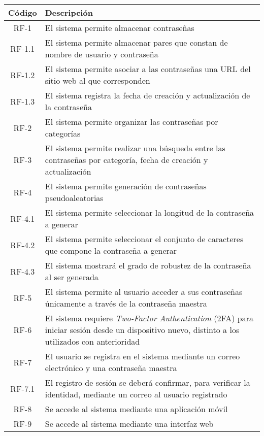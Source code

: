\documentclass{article}
\begin{document}
\begin{table}[H]
    \centering
    \begin{tabular}{| c | p{30em} |}
    \hline
        Código &  Descripción  \\ \hline
        RF-1 & El sistema permite almacenar contraseñas \\ \hline
        RF-1.1 & El sistema permite almacenar pares que constan de nombre de usuario y contraseña  \\ \hline
        RF-1.2 & El sistema permite asociar a las contraseñas una URL del sitio web al que corresponden \\ \hline
        RF-1.3 & El sistema registra la fecha de creación y actualización de la contraseña \\ \hline
        RF-2 & El  sistema permite organizar las contraseñas por categorías \\ \hline
        RF-3 & El sistema permite realizar una búsqueda entre las contraseñas por categoría, fecha de creación y actualización  \\ \hline
        RF-4 & El sistema permite generación de contraseñas pseudoaleatorias \\ \hline
        RF-4.1 & El sistema permite seleccionar la longitud de la contraseña a generar\\ \hline
        RF-4.2 & El sistema permite seleccionar el conjunto de caracteres que compone la contraseña a generar\\ \hline
        RF-4.3 & El sistema mostrará el grado de robustez de la contraseña al ser generada \\ \hline 
        RF-5 & El sistema permite al usuario acceder a sus contraseñas únicamente a través de la contraseña maestra \\ \hline
        RF-6 & El sistema requiere \textit{Two-Factor Authentication} (2FA) para iniciar sesión desde un dispositivo nuevo, distinto a los utilizados con anterioridad \\ \hline
        RF-7 & El usuario se registra en el sistema mediante un correo electrónico y una contraseña maestra\\ \hline
        RF-7.1 & El registro de sesión se deberá confirmar, para verificar la identidad, mediante un correo al usuario registrado \\ \hline
        RF-8 & Se accede al sistema mediante una aplicación móvil \\ \hline
        RF-9 & Se accede al sistema mediante una interfaz web \\ \hline
    \end{tabular}
\end{table}
\end{document}
